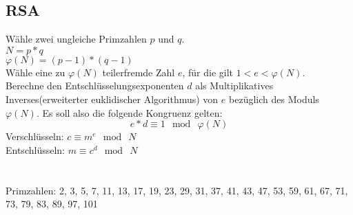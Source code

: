 \documentclass[11pt]{article}
\begin{document}
\subsection{RSA}
W{\"a}hle zwei ungleiche Primzahlen $p$ und $q$.\\
$N=p * q$\\
$\varphi (N)=(p-1) * (q-1)$\\
W{\"a}hle eine zu $\varphi (N)$ teilerfremde Zahl $e$, f{\"u}r die gilt $1<e<\varphi (N)$.\\
Berechne den Entschl{\"u}sselungsexponenten $d$ als Multiplikatives Inverses(erweiterter euklidischer Algorithmus) von $e$ bez{\"u}glich des Moduls $\varphi (N)$. Es soll also die folgende Kongruenz gelten: $$ e * d\equiv 1\ {\bmod \ }\varphi (N)$$
Verschl{\"u}sseln: $c\equiv m^{e}\ {\bmod \ }N$\\
Entschl{\"u}sseln: $m\equiv c^{d}\ {\bmod \ }N$\\\\\\
Primzahlen: 2, 3, 5, 7, 11, 13, 17, 19, 23, 29, 31, 37, 41, 43, 47, 53, 59, 61, 67, 71, 73, 79, 83, 89, 97, 101
    
\end{document}
